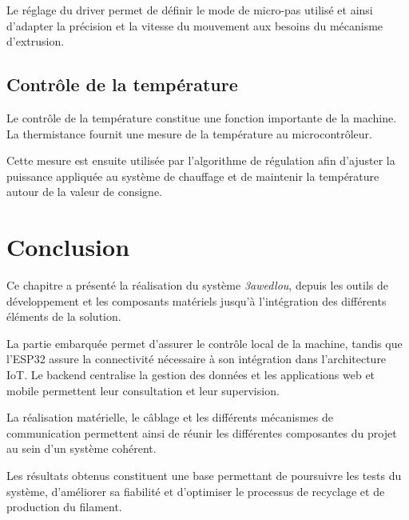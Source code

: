 Le réglage du driver permet de définir le mode de micro-pas utilisé et
ainsi d'adapter la précision et la vitesse du mouvement aux besoins du
mécanisme d'extrusion.

\subsection{Contrôle de la température}

Le contrôle de la température constitue une fonction importante de la
machine. La thermistance fournit une mesure de la température au
microcontrôleur.

Cette mesure est ensuite utilisée par l'algorithme de régulation afin
d'ajuster la puissance appliquée au système de chauffage et de maintenir
la température autour de la valeur de consigne.

%

\section{Conclusion}

Ce chapitre a présenté la réalisation du système \textit{3awedlou}, depuis
les outils de développement et les composants matériels jusqu'à
l'intégration des différents éléments de la solution.

La partie embarquée permet d'assurer le contrôle local de la machine,
tandis que l'ESP32 assure la connectivité nécessaire à son intégration
dans l'architecture IoT. Le backend centralise la gestion des données et
les applications web et mobile permettent leur consultation et leur
supervision.

La réalisation matérielle, le câblage et les différents mécanismes de
communication permettent ainsi de réunir les différentes composantes du
projet au sein d'un système cohérent.

Les résultats obtenus constituent une base permettant de poursuivre les
tests du système, d'améliorer sa fiabilité et d'optimiser le processus de
recyclage et de production du filament.